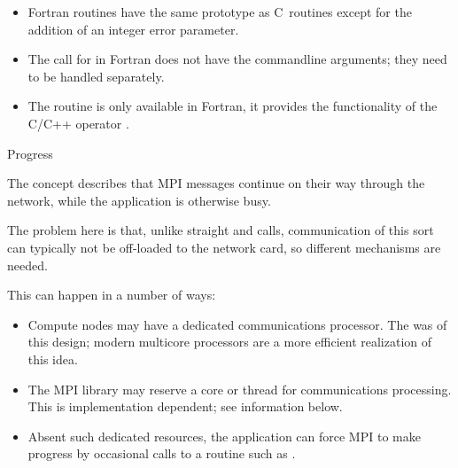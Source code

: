 \begin{itemize}
\item Fortran routines have the same prototype as C~routines except for the addition
  of an integer error parameter.
\item The call for
   in Fortran
  does not have the commandline arguments;
  they need to be handled separately.
\item The routine  is only available in
  Fortran, it provides the functionality of the C/C++ operator
  .
\end{itemize}


 {Progress}
\label{sec:progress}

The concept  describes
that MPI messages continue on their way through the network,
while the application is otherwise busy.

The problem here is that, unlike straight  and
 calls,
communication of this sort can 
typically not be off-loaded to the network card, so different
mechanisms are needed.

This can happen in a number of ways:
\begin{itemize}
\item Compute nodes may have a dedicated communications processor. The
   was of this design; modern
  multicore processors are a more efficient realization of this idea.
\item The MPI library may reserve a core or thread for communications
  processing. This is implementation dependent;
  see  information below.
\item Absent such dedicated resources, the application can force MPI
  to make progress by occasional calls to a 
  routine such as .
\end{itemize}

